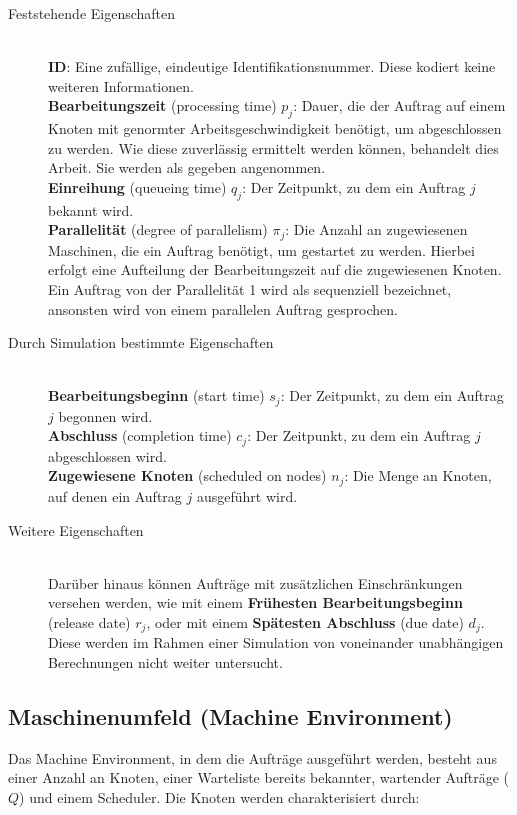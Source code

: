 \begin{description}
\item[Feststehende Eigenschaften] \hfil \\
\textbf{ID}: Eine zufällige, eindeutige Identifikationsnummer. Diese kodiert keine weiteren Informationen.\\
\textbf{Bearbeitungszeit} (processing time) $p_j$: Dauer, die der Auftrag auf einem Knoten mit genormter Arbeitsgeschwindigkeit benötigt, um abgeschlossen zu werden. Wie diese zuverlässig ermittelt werden können, behandelt dies Arbeit. Sie werden als gegeben angenommen. \\
\textbf{Einreihung} (queueing time) $q_j$: Der Zeitpunkt, zu dem ein Auftrag $j$ bekannt wird.\\
\textbf{Parallelität} (degree of parallelism) $\pi_j$: Die Anzahl an zugewiesenen Maschinen, die ein Auftrag benötigt, um gestartet zu werden. Hierbei erfolgt eine Aufteilung der Bearbeitungszeit auf die zugewiesenen Knoten. Ein Auftrag von der Parallelität 1 wird als sequenziell bezeichnet, ansonsten wird von einem parallelen Auftrag gesprochen.\\
\item[Durch Simulation bestimmte Eigenschaften]\hfill \\ 
\textbf{Bearbeitungsbeginn} (start time) $s_j$: Der Zeitpunkt, zu dem ein Auftrag $j$ begonnen wird. \\
\textbf{Abschluss} (completion time) $c_j$: Der Zeitpunkt, zu dem ein Auftrag $j$ abgeschlossen wird.\\
\textbf{Zugewiesene Knoten} (scheduled on nodes) $n_j$: Die Menge an Knoten, auf denen ein Auftrag $j$ ausgeführt wird.\\

\item[Weitere Eigenschaften] \hfil \\
Darüber hinaus können Aufträge mit zusätzlichen Einschränkungen versehen werden, wie mit einem \textbf{Frühesten Bearbeitungsbeginn} (release date) $r_j$, oder mit einem \textbf{Spätesten Abschluss} (due date) $d_j$. Diese werden im Rahmen einer Simulation von voneinander unabhängigen Berechnungen nicht weiter untersucht.
\end{description}

\subsection{Maschinenumfeld (Machine Environment)}
Das Machine Environment, in dem die Aufträge ausgeführt werden, besteht aus einer Anzahl an Knoten, einer Warteliste bereits bekannter, wartender Aufträge ($Q$) und einem Scheduler. Die Knoten werden charakterisiert durch:

